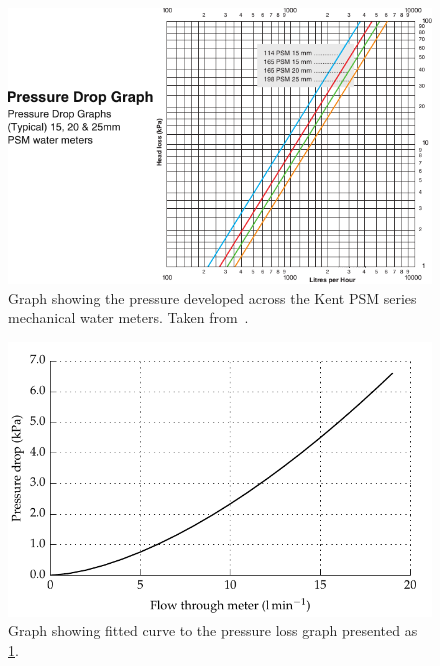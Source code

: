     \begin{figure}
        \centering
        \includegraphics[width=\linewidth]{content/pt1/02-WirelessWaterMeter/graphics/Kent-PSM-HeadLoss}
        \caption{Graph showing the pressure developed across the Kent PSM series mechanical water meters. Taken from~\cite{Elster2008}.}
        \label{fig:headloss}
    \end{figure}

    \begin{figure}
        \centering
        \includegraphics[width=\linewidth]{content/pt1/02-WirelessWaterMeter/graphics/graph_pressureLoss}
        \caption{Graph showing fitted curve to the pressure loss graph presented as \cref{fig:headloss}.}
        \label{fig:headloss_fit}
    \end{figure}

